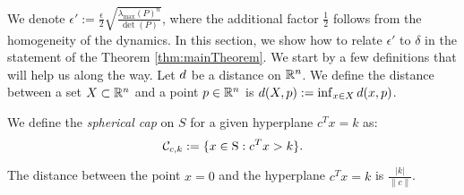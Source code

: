We denote $\epsilon':=\frac{\epsilon}{2} \sqrt{\frac{\lambda_{\max}(P)^n}{\det(P)}}$, where the additional factor $\frac{1}{2}$ follows from the homogeneity of the dynamics. In this section, we show how to relate $\epsilon'$ to $\delta$ in the statement of the Theorem \ref{thm:mainTheorem}. We start by a few definitions that will help us along the way. Let $d$ be a distance on $\mathbb{R}^n$. We define the distance between a set $X \subset \mathbb{R}^n$ and a point $p \in \mathbb{R}^n$ is $d(X, p):=\inf_{x \in X}d(x,p)$.

\begin{definition}%
We define the \emph{spherical cap} on $S$ for a given hyperplane $c^Tx = k$ as:
\begin{equation*}\mathcal{C}_{c,k} := \{x \in \text{S} : c^Tx >k\}.\end{equation*}
\end{definition}





\begin{proposition}\label{prop:distance}The distance between the point $x=0$ and the hyperplane $c^Tx = k$ is $\frac{|k|}{\|c\|}$.
\end{proposition}


